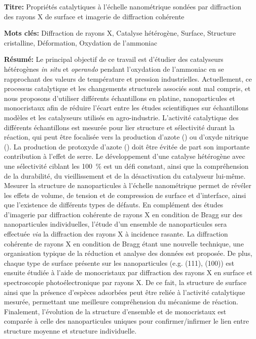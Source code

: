 \begin{mdframed}[linecolor=Prune,linewidth=1]

\textbf{Titre:} Propriétés catalytiques à l’échelle nanométrique sondées par diffraction des rayons X de surface et imagerie de diffraction cohérente

\noindent \textbf{Mots clés:} Diffraction de rayons X, Catalyse hétérogène, Surface, Structure cristalline, Déformation, Oxydation de l'ammoniac

\vspace{-.5cm}
\begin{multicols}{2}
\noindent \textbf{Résumé:}
Le principal objectif de ce travail est d'étudier des catalyseurs hétérogènes \textit{in situ} et \textit{operando} pendant l'oxydation de l'ammoniac en se rapprochant des valeurs de température et pression industrielles.
Actuellement, ce processus catalytique et les changements structurels associés sont mal compris, et nous proposons d'utiliser différents échantillons en platine, nanoparticules et monocristaux afin de réduire l'écart entre les études scientifiques sur échantillons modèles et les catalyseurs utilisés en agro-industrie.
L'activité catalytique des différents échantillons est mesurée pour lier structure et sélectivité durant la réaction, qui peut être focalisée vers la production d'azote () ou d'oxyde nitrique ().
La production de protoxyde d'azote () doit être évitée de part son importante contribution à l'effet de serre.
Le développement d'une catalyse hétérogène avec une sélectivité ciblant les \qty{100}{\percent} est un défi constant, ainsi que la compréhension de la durabilité, du vieillissement et de la désactivation du catalyseur lui-même.
Mesurer la structure de nanoparticules à l'échelle nanométrique permet de révéler les effets de volume, de tension et de compression de surface et d'interface, ainsi que l'existence de différents types de défauts.
En complément des études d'imagerie par diffraction cohérente de rayons X en condition de Bragg sur des nanoparticules individuelles, l'étude d'un ensemble de nanoparticules sera effectuée \textit{via} la diffraction des rayons X à incidence rasante.
La diffraction cohérente de rayons X en condition de Bragg étant une nouvelle technique, une organisation typique de la réduction et analyse des données est proposée.
De plus, chaque type de surface présente sur les nanoparticules (e.g. (111), (100)) est ensuite étudiée à l'aide de monocristaux par diffraction des rayons X en surface et spectroscopie photoélectronique par rayons X.
De ce fait, la structure de surface ainsi que la présence d'espèces adsorbées peut être reliée à l'activité catalytique mesurée, permettant une meilleure compréhension du mécanisme de réaction.
Finalement, l'évolution de la structure d'ensemble et de monocristaux est comparée à celle des nanoparticules uniques pour confirmer/infirmer le lien entre structure moyenne et structure individuelle.

\end{multicols}

\end{mdframed}

